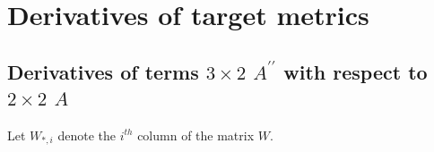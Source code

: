 \documentclass{report}
\begin{document}


\chapter{Derivatives of target metrics}

\section{Derivatives of terms $3 \times 2$ $A^{\prime\prime}$ with respect to $2 \times 2$ $A$}

Let $W_{*,i}$ denote the $i^{th}$ column of the matrix $W$.
\end{document}
